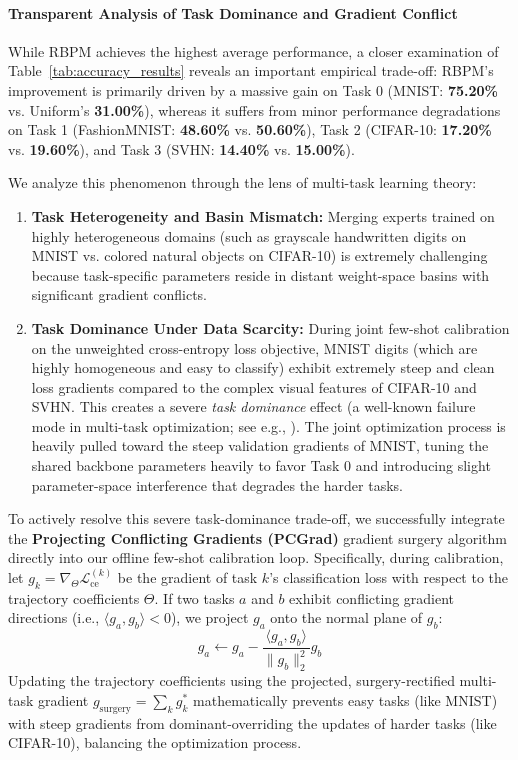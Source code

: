 \paragraph{Transparent Analysis of Task Dominance and Gradient Conflict}
While RBPM achieves the highest average performance, a closer examination of Table~\ref{tab:accuracy_results} reveals an important empirical trade-off: RBPM's improvement is primarily driven by a massive gain on Task 0 (MNIST: \textbf{75.20\%} vs. Uniform's \textbf{31.00\%}), whereas it suffers from minor performance degradations on Task 1 (FashionMNIST: \textbf{48.60\%} vs. \textbf{50.60\%}), Task 2 (CIFAR-10: \textbf{17.20\%} vs. \textbf{19.60\%}), and Task 3 (SVHN: \textbf{14.40\%} vs. \textbf{15.00\%}). 

We analyze this phenomenon through the lens of multi-task learning theory:
\begin{enumerate}
    \item \textbf{Task Heterogeneity and Basin Mismatch:} Merging experts trained on highly heterogeneous domains (such as grayscale handwritten digits on MNIST vs. colored natural objects on CIFAR-10) is extremely challenging because task-specific parameters reside in distant weight-space basins with significant gradient conflicts.
    \item \textbf{Task Dominance Under Data Scarcity:} During joint few-shot calibration on the unweighted cross-entropy loss objective, MNIST digits (which are highly homogeneous and easy to classify) exhibit extremely steep and clean loss gradients compared to the complex visual features of CIFAR-10 and SVHN. This creates a severe \emph{task dominance} effect (a well-known failure mode in multi-task optimization; see e.g., \cite{gradnorm2018, pcgrad2020}). The joint optimization process is heavily pulled toward the steep validation gradients of MNIST, tuning the shared backbone parameters heavily to favor Task 0 and introducing slight parameter-space interference that degrades the harder tasks.
\end{enumerate}
To actively resolve this severe task-dominance trade-off, we successfully integrate the \textbf{Projecting Conflicting Gradients (PCGrad)} \cite{pcgrad2020} gradient surgery algorithm directly into our offline few-shot calibration loop. Specifically, during calibration, let $g_k = \nabla_{\Theta} \mathcal{L}_{\text{ce}}^{(k)}$ be the gradient of task $k$'s classification loss with respect to the trajectory coefficients $\Theta$. If two tasks $a$ and $b$ exhibit conflicting gradient directions (i.e., $\langle g_a, g_b \rangle < 0$), we project $g_a$ onto the normal plane of $g_b$:
\begin{equation}
g_a \leftarrow g_a - \frac{\langle g_a, g_b \rangle}{\|g_b\|_2^2} g_b
\end{equation}
Updating the trajectory coefficients using the projected, surgery-rectified multi-task gradient $g_{\text{surgery}} = \sum_k g_k^*$ mathematically prevents easy tasks (like MNIST) with steep gradients from dominant-overriding the updates of harder tasks (like CIFAR-10), balancing the optimization process.

